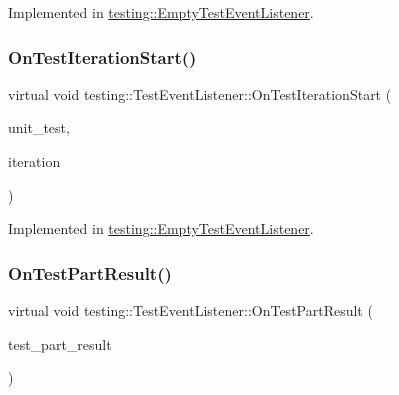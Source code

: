 Implemented in \mbox{\hyperlink{classtesting_1_1_empty_test_event_listener_a2253e5a18b3cf7bccd349567a252209d}{testing\+::\+Empty\+Test\+Event\+Listener}}.

\mbox{\label{classtesting_1_1_test_event_listener_a60cc09b7907cb329d152eb5e7133bdeb}} 
\subsubsection{\texorpdfstring{OnTestIterationStart()}{OnTestIterationStart()}}
{\footnotesize\ttfamily virtual void testing\+::\+Test\+Event\+Listener\+::\+On\+Test\+Iteration\+Start (\begin{DoxyParamCaption}\item[{const \mbox{\hyperlink{classtesting_1_1_unit_test}{Unit\+Test}} \&}]{unit\+\_\+test,  }\item[{int}]{iteration }\end{DoxyParamCaption})\hspace{0.3cm}{\ttfamily [pure virtual]}}



Implemented in \mbox{\hyperlink{classtesting_1_1_empty_test_event_listener_a836f05829855dc60d13ba99ad712c0dd}{testing\+::\+Empty\+Test\+Event\+Listener}}.

\mbox{\label{classtesting_1_1_test_event_listener_a054f8705c883fa120b91473aff38f2ee}} 
\subsubsection{\texorpdfstring{OnTestPartResult()}{OnTestPartResult()}}
{\footnotesize\ttfamily virtual void testing\+::\+Test\+Event\+Listener\+::\+On\+Test\+Part\+Result (\begin{DoxyParamCaption}\item[{const \mbox{\hyperlink{classtesting_1_1_test_part_result}{Test\+Part\+Result}} \&}]{test\+\_\+part\+\_\+result }\end{DoxyParamCaption})\hspace{0.3cm}{\ttfamily [pure virtual]}}



